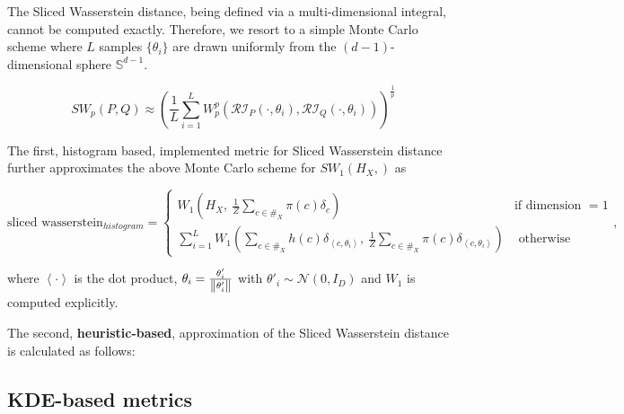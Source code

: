 The Sliced Wasserstein distance, being defined via a multi-dimensional integral, cannot be computed exactly. Therefore, we resort to a simple Monte Carlo scheme where $L$ samples $\{\theta_i\}$ are drawn uniformly from the $(d-1)$-dimensional sphere $\mathbb S^{d-1}$.

$$ 
SW_p(P, Q) \approx \left( \frac 1 L \sum_{i=1}^L W_p^p\left(\mathcal{RI}_P(\cdot, \theta_i), \mathcal{RI}_Q(\cdot, \theta_i) \right) \right)^{\frac 1 p}
$$

The first, histogram based, implemented metric for Sliced Wasserstein distance further approximates the above Monte Carlo scheme for $SW_1\left(H_X, \right)$ as

\[\text{sliced wasserstein}_{histogram} = \begin{cases}
W_1 \left( H_X,\  \frac 1 Z \sum_{c \in \#_X} \pi(c) \delta_c \right) & \text{if dimension } = 1 \\
\sum_{i = 1}^L W_1 \left( \sum_{c \in \#_X} h(c) \delta_{\left<c, \theta_i \right>},\  \frac 1 Z \sum_{c \in \#_X} \pi(c) \delta_{\left<c, \theta_i \right>}  \right) & \text{ otherwise }
\end{cases},\]

where $\left< \cdot \right>$ is the dot product, $\theta_i = \frac{\theta'_i}{\norm{\theta'_i}}$ with $
\theta'_i \sim \mathcal N(0, I_D)$ and $W_1$ is computed explicitly.

The second, \textbf{heuristic-based}, approximation of the Sliced Wasserstein distance is calculated as follows:



\subsection{KDE-based metrics}